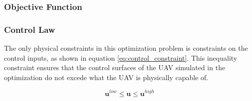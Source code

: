 \subsubsection{Objective Function}


\subsubsection{Control Law}

The only physical constraints in this optimization problem is constraints on the control inputs, as shown in equation \ref{eq:control_constraint}. This inequality constraint ensures that the control surfaces of the UAV simulated in the optimization do not excede what the UAV is physically capable of.

\begin{equation}
	\label{eq:control_constraint}
	\mathbf{u}^{low} \leq \mathbf{u} \leq \mathbf{u}^{high}
\end{equation}
